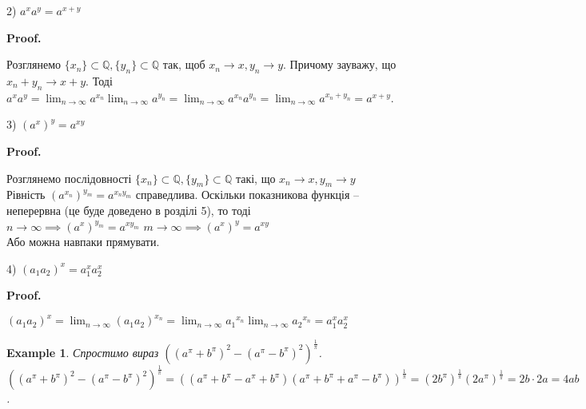 \documentclass[a4paper, 14pt]{article}
\makeatletter
\def\qed{$\blacksquare$}
\theoremstyle{theoremdd}
\theoremstyle{theoremdd}
\theoremstyle{theoremdd}
\theoremstyle{theoremdd}
\newtheorem{example}[theorem]{Example}
\theoremstyle{theoremdd}
\theoremstyle{theoremdd}
\theoremstyle{theoremdd}
\theoremstyle{theoremdd}
\renewenvironment{proof}[1][Proof.\\]{\par
\pushQED{\hfill \qed}%
\normalfont \topsep6\p@\@plus6\p@\relax
\trivlist
\item\relax
{\bfseries
#1\@addpunct{.}}\hspace\labelsep\ignorespaces
}{%
\popQED\endtrivlist\@endpefalse
}
\makeatother
\begin{document}
2) $a^x a^y = a^{x+y}$
\begin{proof}
Розглянемо $\{x_n\} \subset \mathbb{Q}, \{y_n\} \subset \mathbb{Q}$ так, щоб $x_n \to x, y_n \to y$. Причому зауважу, що $x_n + y_n \to x +y$. Тоді $a^x a^y = \displaystyle\lim_{n \to \infty} a^{x_n} \displaystyle\lim_{n \to \infty} a^{y_n} = \displaystyle\lim_{n \to \infty} a^{x_n} a^{y_n} = \displaystyle\lim_{n \to \infty} a^{x_n+y_n} = a^{x+y}$.
\end{proof}

3) $(a^x)^y = a^{xy}$
\begin{proof}
\iffalse
Розглянемо $\{x_n\} \subset \mathbb{Q}, \{y_n\} \subset \mathbb{Q}$ так, щоб $x_n \to x, y_n \to y$. Зафіксуємо чотири послідовності раціональних чисел $\{q_{1n}\},\{q_{2n}\},\{q_{3n}\},\{q_{4n}\}$, щоб $q_{1n},q_{2n} \to x$, $q_{3n},q_{3n} \to y$, а також \\
$q_{1n} < x < q_{2n}$, $q_{3n} < y < q_{4n}$. Тоді\\
$a^{q_{1n}} < a^x < a^{q_{2n}}$.\\
Аза 2), маємо, що при $y > 0$ (для $y < 0$ аналогічно) маємо\\
$a^{q_{1n} q_{3n}} = (a^{q_{1n}})^{q_{3n}} < (a^{q_{1n}})^y \leq (a^x)^y \leq (a^{q_{2n}})^y < (a^{q_{2n}})^{q_{4n}} = a^{q_{2n} q_{4n}}$.\\
А тепер за теоремою про двох поліцаїв, маємо, що $(a^x)^y = a^{xy}$.
\fi
Розглянемо послідовності $\{x_n\} \subset \mathbb{Q}, \{y_m\} \subset \mathbb{Q}$ такі, що $x_n \to x, y_m \to y$\\
Рівність $(a^{x_n})^{y_m} = a^{x_n y_m}$ справедлива. Оскільки показникова функція -- неперервна (це буде доведено в розділі 5), то тоді\\
$n \to \infty \implies (a^x)^{y_m} = a^{x y_m}$ \hspace{0.5cm} $m \to \infty \implies (a^x)^{y} = a^{xy}$\\
Або можна навпаки прямувати.
\end{proof}

4) $(a_1a_2)^x = a_1^x a_2^x$
\begin{proof}
$(a_1a_2)^x = \displaystyle\lim_{n \to \infty} (a_1a_2)^{x_n} = \displaystyle\lim_{n \to \infty} {a_1}^{x_n} \displaystyle\lim_{n \to \infty} {a_2}^{x_n} = a_1^x a_2^x$
\end{proof}

\begin{example}
Спростимо вираз $\left((a^\pi+b^\pi)^2-(a^\pi-b^\pi)^2 \right)^{\frac{1}{\pi}}$.\\
$\left((a^\pi+b^\pi)^2-(a^\pi-b^\pi)^2 \right)^{\frac{1}{\pi}} = ((a^\pi+b^\pi-a^\pi+b^\pi)(a^\pi+b^\pi+a^\pi-b^\pi))^{\frac{1}{\pi}} = (2b^{\pi})^{\frac{1}{\pi}}(2a^{\pi})^{\frac{1}{\pi}} = 2b \cdot 2a = 4ab$.
\end{example}
\end{document}
